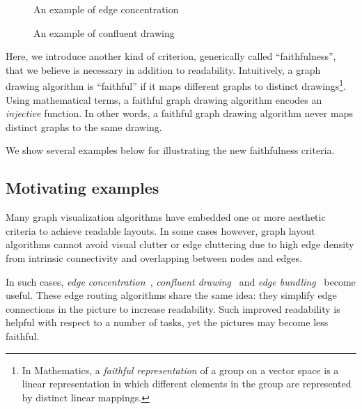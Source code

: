 \documentclass[10pt,journal,cspaper,compsoc]{IEEEtran}
\begin{document}
\begin{figure}\centering
{}
\caption{An example of edge concentration~\cite{newbery1989edge}}\label{fig:concentration}
\end{figure}
\begin{figure}\centering
{}
\caption{An example of confluent drawing ~\cite{eppstein2007confluent}}\label{fig:confluent}
\end{figure}
Here, we introduce another kind of criterion, generically
called ``faithfulness'', that we believe is necessary in addition to
readability. Intuitively, a graph drawing algorithm is ``faithful'' if
it maps different graphs to distinct drawings\footnote{In Mathematics,
a \emph{faithful representation} of a group on a vector space is a
linear representation in which different elements in the group are
represented by distinct linear mappings.}. Using mathematical terms, a faithful graph
drawing algorithm encodes an \emph{injective} function. In other words, a faithful graph drawing algorithm never maps distinct graphs to the same drawing.

We show several examples below for illustrating the new faithfulness criteria.

\subsection{Motivating examples\label{sec:vizmotivation}}
Many graph visualization algorithms have embedded one or more aesthetic criteria to achieve readable layouts. In some cases however, graph layout algorithms cannot avoid visual clutter or edge cluttering due to high edge density from intrinsic connectivity and overlapping between nodes and edges.


In such cases, \emph{edge concentration}~\cite{newbery1989edge},  \emph{confluent drawing}~\cite{dickerson2004confluent,eppstein2006delta} and \emph{edge bundling}~\cite{holten2006hierarchical,zhou2008energy,gansner2011multilevel}
become useful. These edge routing algorithms share the same idea: they simplify edge connections in the picture to increase readability. Such improved readability is helpful with respect to a number of tasks, yet the pictures may become less faithful.
\end{document}
